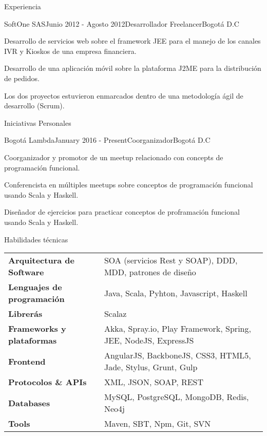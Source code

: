 \documentclass[spanish]{resume} %
\begin{document}
\begin{rSection}{Experiencia}
\begin{rSubsection}{SoftOne SAS}{Junio 2012 - Agosto 2012}{Desarrollador Freelancer}{Bogot\'a D.C}
\item Desarrollo de servicios web sobre el framework JEE para el manejo de los canales IVR y Kioskos de una empresa financiera.
\item Desarrollo de una aplicaci\'on m\'ovil sobre la plataforma J2ME para la distribuci\'on de pedidos.
\item Los dos proyectos estuvieron enmarcados dentro de una metodolog\'ia \'agil de desarrollo (Scrum).
\end{rSubsection}

\end{rSection}


\begin{rSection}{Iniciativas Personales}

\begin{rSubsection}{Bogot\'a Lambda}{January 2016 - Present}{Coorganizador}{Bogot\'a D.C}
\item Coorganizador y promotor de un meetup relacionado con concepts de programaci\'on funcional.
\item Conferencista en m\'ultiples meetups sobre conceptos de programaci\'on funcional usando Scala y Haskell.
\item Dise\~nador de ejercicios para practicar conceptos de proframaci\'on funcional usando Scala y Haskell.
\end{rSubsection}

\end{rSection}


\begin{rSection}{Habilidades t\'ecnicas}

\begin{tabular}{ @{} >{\bfseries}l @{\hspace{6ex}} l }
Arquitectura de Software & SOA (servicios Rest y SOAP), DDD, MDD, patrones de dise\~no \\
Lenguajes de programaci\'on & Java, Scala, Pyhton, Javascript, Haskell \\
Librer\'as & Scalaz \\ 
Frameworks y plataformas & Akka, Spray.io, Play Framework, Spring, JEE, NodeJS, ExpressJS \\
Frontend & AngularJS, BackboneJS, CSS3, HTML5, Jade, Stylus, Grunt, Gulp \\
Protocolos \& APIs & XML, JSON, SOAP, REST \\
Databases & MySQL, PostgreSQL, MongoDB, Redis, Neo4j \\
Tools & Maven, SBT, Npm, Git, SVN
\end{tabular}

\end{rSection}
\end{document}
